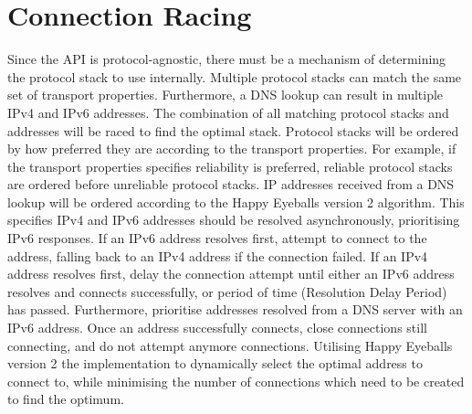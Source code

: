 \section{Connection Racing}\label{sec:connection-racing}
Since the API is protocol-agnostic, there must be a mechanism of determining the protocol stack to use internally.
Multiple protocol stacks can match the same set of transport properties.
Furthermore, a DNS lookup can result in multiple IPv4 and IPv6 addresses.
The combination of all matching protocol stacks and addresses will be raced to find the optimal stack.
Protocol stacks will be ordered by how preferred they are according to the transport properties.
For example, if the transport properties specifies reliability is preferred, reliable protocol stacks are ordered before
unreliable protocol stacks.
IP addresses received from a DNS lookup will be ordered according to the Happy Eyeballs version 2 algorithm.
This specifies IPv4 and IPv6 addresses should be resolved asynchronously, prioritising IPv6 responses.
If an IPv6 address resolves first, attempt to connect to the address, falling back to an IPv4 address if the connection
failed.
If an IPv4 address resolves first, delay the connection attempt until either an IPv6 address resolves and connects
successfully, or period of time (Resolution Delay Period) has passed.
Furthermore, prioritise addresses resolved from a DNS server with an IPv6 address.
Once an address successfully connects, close connections still connecting, and do not attempt anymore connections.
Utilising Happy Eyeballs version 2 the implementation to dynamically select the optimal address to connect to, while
minimising the number of connections which need to be created to find the optimum.

